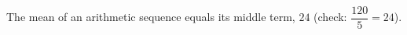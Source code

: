 The mean of an arithmetic sequence equals its middle term, $\boxed{24}$ (check: $\dfrac{120}{5}=24$).

